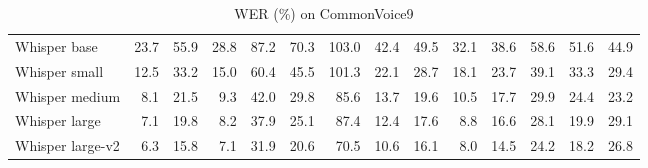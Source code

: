 \documentclass[nohyperref]{article}
\theoremstyle{plain}
\theoremstyle{definition}
\theoremstyle{remark}
\begin{document}
\begin{table}[H]
\begin{tabular}{l|rrrrrrrrrrrrr}
Whisper base 
& 23.7 & 55.9 & 28.8 & 87.2 & 70.3 & 103.0 & 42.4 & 49.5 & 32.1 & 38.6 & 58.6 & 51.6 & 44.9 
\\
Whisper small 
& 12.5 & 33.2 & 15.0 & 60.4 & 45.5 & 101.3 & 22.1 & 28.7 & 18.1 & 23.7 & 39.1 & 33.3 & 29.4 
\\
Whisper medium 
& 8.1 & 21.5 & 9.3 & 42.0 & 29.8 & 85.6 & 13.7 & 19.6 & 10.5 & 17.7 & 29.9 & 24.4 & 23.2 
\\
Whisper large 
& 7.1 & 19.8 & 8.2 & 37.9 & 25.1 & 87.4 & 12.4 & 17.6 & 8.8 & 16.6 & 28.1 & 19.9 & 29.1 
\\
Whisper large-v2 
& 6.3 & 15.8 & 7.1 & 31.9 & 20.6 & 70.5 & 10.6 & 16.1 & 8.0 & 14.5 & 24.2 & 18.2 & 26.8 
\\
\bottomrule
\end{tabular}
\caption{WER (\%) on CommonVoice9}\label{tab:cv9-asr}
\end{table}
 \vspace{-1em}
\end{document}
